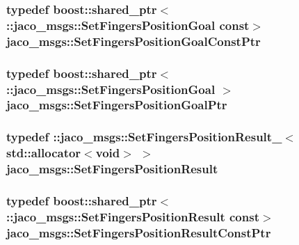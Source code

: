 \subsubsection[{\texorpdfstring{Set\+Fingers\+Position\+Goal\+Const\+Ptr}{SetFingersPositionGoalConstPtr}}]{\setlength{\rightskip}{0pt plus 5cm}typedef boost\+::shared\+\_\+ptr$<$ \+::{\bf jaco\+\_\+msgs\+::\+Set\+Fingers\+Position\+Goal} const$>$ {\bf jaco\+\_\+msgs\+::\+Set\+Fingers\+Position\+Goal\+Const\+Ptr}}\hypertarget{namespacejaco__msgs_a4432ef01b2858fafbc445a38e7c6dcba}{}\label{namespacejaco__msgs_a4432ef01b2858fafbc445a38e7c6dcba}
\subsubsection[{\texorpdfstring{Set\+Fingers\+Position\+Goal\+Ptr}{SetFingersPositionGoalPtr}}]{\setlength{\rightskip}{0pt plus 5cm}typedef boost\+::shared\+\_\+ptr$<$ \+::{\bf jaco\+\_\+msgs\+::\+Set\+Fingers\+Position\+Goal} $>$ {\bf jaco\+\_\+msgs\+::\+Set\+Fingers\+Position\+Goal\+Ptr}}\hypertarget{namespacejaco__msgs_af6a0d40b47aaa8ea0abb9a71882ba8f3}{}\label{namespacejaco__msgs_af6a0d40b47aaa8ea0abb9a71882ba8f3}
\subsubsection[{\texorpdfstring{Set\+Fingers\+Position\+Result}{SetFingersPositionResult}}]{\setlength{\rightskip}{0pt plus 5cm}typedef \+::{\bf jaco\+\_\+msgs\+::\+Set\+Fingers\+Position\+Result\+\_\+}$<$std\+::allocator$<$void$>$ $>$ {\bf jaco\+\_\+msgs\+::\+Set\+Fingers\+Position\+Result}}\hypertarget{namespacejaco__msgs_a8e55cc3036f6b7bfa0fbc5712715ec42}{}\label{namespacejaco__msgs_a8e55cc3036f6b7bfa0fbc5712715ec42}
\subsubsection[{\texorpdfstring{Set\+Fingers\+Position\+Result\+Const\+Ptr}{SetFingersPositionResultConstPtr}}]{\setlength{\rightskip}{0pt plus 5cm}typedef boost\+::shared\+\_\+ptr$<$ \+::{\bf jaco\+\_\+msgs\+::\+Set\+Fingers\+Position\+Result} const$>$ {\bf jaco\+\_\+msgs\+::\+Set\+Fingers\+Position\+Result\+Const\+Ptr}}\hypertarget{namespacejaco__msgs_a1a5dd085ab24f499552dec04402bceb8}{}\label{namespacejaco__msgs_a1a5dd085ab24f499552dec04402bceb8}
